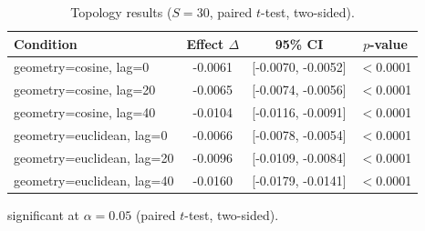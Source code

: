 \begin{table}[t]
  \centering
  \caption{Topology results ($S=30$, paired $t$-test, two-sided).}
  \label{tab:topology}
  \begin{tabular}{lccc}
    \toprule
    Condition & Effect $\Delta$ & 95\% CI & $p$-value \\
    \midrule
    geometry=cosine, lag=0 & -0.0061\dag{} & [-0.0070, -0.0052] & $<$0.0001 \\
    geometry=cosine, lag=20 & -0.0065\dag{} & [-0.0074, -0.0056] & $<$0.0001 \\
    geometry=cosine, lag=40 & -0.0104\dag{} & [-0.0116, -0.0091] & $<$0.0001 \\
    geometry=euclidean, lag=0 & -0.0066\dag{} & [-0.0078, -0.0054] & $<$0.0001 \\
    geometry=euclidean, lag=20 & -0.0096\dag{} & [-0.0109, -0.0084] & $<$0.0001 \\
    geometry=euclidean, lag=40 & -0.0160\dag{} & [-0.0179, -0.0141] & $<$0.0001 \\
    \bottomrule
  \end{tabular}
  \begin{minipage}{\linewidth}
    \vspace{4pt}
    \footnotesize \dag{} significant at $\alpha = 0.05$ (paired $t$-test, two-sided).
  \end{minipage}
\end{table}